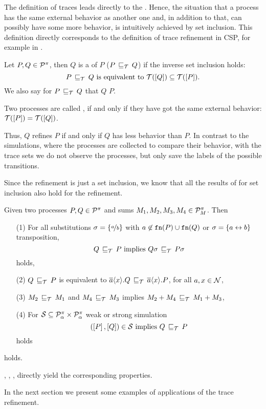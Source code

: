 The definition of traces leads directly to the . Hence, the situation that a process has the same external behavior as another one and, in addition to that, can possibly have some more behavior, is intuitively achieved by set inclusion. This definition directly corresponds to the definition of trace refinement in \gls{CSP}, for example in \cite{roscoe}.

\begin{definition}
\label{def_trace_ref}
	Let $P,Q\in\mathcal P^{\pi}$, then $Q$ is a  of $P$ ($P\refi Q$) if the inverse set inclusion holds:
		\[P\refi Q \text{ is equivalent to } \traces[Q]\subseteq\traces[P].\]	
	We also say for $P\refi{}Q$ that $Q$  $P$.

	Two processes are called , if and only if they have got the same external behavior: $\traces[P]=\traces[Q]$.
\end{definition}

Thus, $Q$ refines $P$ if and only if $Q$ has less behavior than $P$. In contrast to the simulations, where the processes are collected to compare their behavior, with the trace sets we do not observe the processes, but only save the labels of the possible transitions.

Since the refinement is just a set inclusion, we know that all the results of  for set inclusion also hold for the refinement.

\begin{lemma}
\label{lemma_ref_properties}
Given two processes $P,Q\in\mathcal P^{\pi}$ and sums $M_1,M_2,M_3,M_4\in\mathcal P^{\pi}_{M}$. Then
\begin{itemize}
\item[(1)] For all substitutions $\sigma=\left\{\nicefrac{a}{b}\right\}$ with $a\not\in\mathtt{fn}(P)\cup\mathtt{fn}(Q)$ or $\sigma=\left\{a\leftrightarrow{}b\right\}$ transposition,
\[Q \refi P \text{ implies } Q\sigma \refi P\sigma\]
holds,
\item[(2)] $Q \refi P$ is equivalent to $\out{a}{x}.Q \refi \out{a}{x}.P$, for all $a,x\in\mathcal N$,
\item[(3)] $M_2  \refi M_1$ and $M_4 \refi M_3$ implies $\procchoice{M_2}{M_4} \refi \procchoice{M_1}{M_3}$,
\item[(4)] For $\mathcal{S}\subseteq\mathcal P^{\pi}_\alpha\times\mathcal P^{\pi}_\alpha$ weak or strong simulation
\[(\ec{P},\ec{Q})\in{}\simu \text{ implies } Q \refi P\]
holds
\end{itemize}
holds.
\end{lemma}
\begin{prf}
, , ,  directly yield the corresponding properties.
\end{prf}

In the next section we present some examples of applications of the trace refinement.
